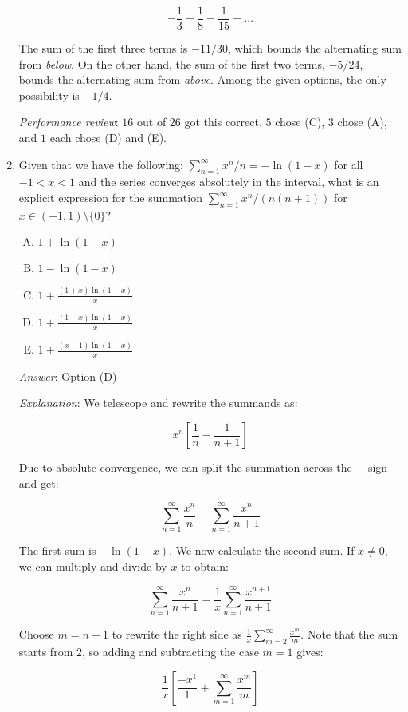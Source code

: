 \documentclass[10pt]{amsart}
\begin{document}
\begin{enumerate}
  $$-\frac{1}{3} + \frac{1}{8} - \frac{1}{15} + \dots$$

  The sum of the first three terms is $-11/30$, which bounds the
  alternating sum from {\em below}. On the other hand, the sum of the
  first two terms, $-5/24$, bounds the alternating sum from {\em
  above}. Among the given options, the only possibility is $-1/4$.

  {\em Performance review}: $16$ out of $26$ got this correct. $5$
  chose (C), $3$ chose (A), and $1$ each chose (D) and (E).

\item Given that we have the following: $\sum_{n=1}^\infty x^n/n =
  -\ln(1 - x)$ for all $-1 < x < 1$ and the series converges
  absolutely in the interval, what is an explicit expression for the
  summation $\sum_{n=1}^\infty x^n/(n(n+1))$ for $x \in (-1,1)
  \setminus \{ 0 \}$?

  \begin{enumerate}[(A)]
  \item $1 + \ln(1 - x)$
  \item $1 - \ln(1 - x)$
  \item $1 + \frac{(1 + x)\ln(1 - x)}{x}$
  \item $1 + \frac{(1 - x)\ln(1 - x)}{x}$
  \item $1 + \frac{(x - 1)\ln(1 - x)}{x}$
  \end{enumerate}

  {\em Answer}: Option (D)

  {\em Explanation}: We telescope and rewrite the summands as:

  $$x^n\left[\frac{1}{n} - \frac{1}{n + 1}\right]$$

  Due to absolute convergence, we can split the summation across the
  $-$ sign and get:

  $$\sum_{n=1}^\infty \frac{x^n}{n} - \sum_{n=1}^\infty \frac{x^n}{n + 1}$$

  The first sum is $-\ln(1 - x)$. We now calculate the second sum. If
  $x \ne 0$, we can multiply and divide by $x$ to obtain:

  $$\sum_{n=1}^\infty \frac{x^n}{n + 1} = \frac{1}{x} \sum_{n=1}^\infty \frac{x^{n +1}}{n + 1}$$

  Choose $m = n + 1$ to rewrite the right side as $\frac{1}{x}
  \sum_{m=2}^\infty \frac{x^m}{m}$. Note that the sum starts from $2$,
  so adding and subtracting the case $m =1$ gives:

  $$\frac{1}{x} \left[\frac{-x^1}{1} + \sum_{m=1}^\infty \frac{x^m}{m}\right]$$


\end{enumerate}
\end{document}
